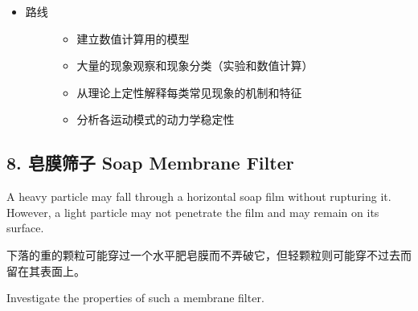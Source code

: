 \documentclass[a4paper,10pt,english]{sphinxmanual}
\begin{document}
\begin{itemize}
\item {} \begin{description}
\item[{路线}] \leavevmode\begin{itemize}
\item {} 
建立数值计算用的模型

\item {} 
大量的现象观察和现象分类（实验和数值计算）

\item {} 
从理论上定性解释每类常见现象的机制和特征

\item {} 
分析各运动模式的动力学稳定性

\end{itemize}

\end{description}

\end{itemize}


\subsection{8. 皂膜筛子 Soap Membrane Filter}
\label{\detokenize{7. Appendix:soap-membrane-filter}}
A heavy particle may fall through a horizontal soap film without rupturing it. However, a light particle may not penetrate the film and may remain on its surface.

下落的重的颗粒可能穿过一个水平肥皂膜而不弄破它，但轻颗粒则可能穿不过去而留在其表面上。

Investigate the properties of such a membrane filter.
\end{document}
